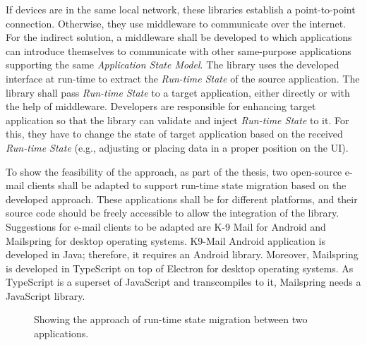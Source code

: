 If devices are in the same local network, these libraries establish a point-to-point connection. Otherwise, they use middleware to communicate over the internet.
For the indirect solution, a middleware shall be developed to which applications can introduce themselves to communicate with other same-purpose applications supporting the same \textit{Application State Model}. 
The library uses the developed interface at run-time to extract the \textit{Run-time State} of the source application. The library shall pass \textit{Run-time State} to a target application, either directly or with the help of middleware. 
Developers are responsible for enhancing target application so that the library can validate and inject \textit{Run-time State} to it. 
For this, they have to change the state of target application based on the received \textit{Run-time State} (e.g., adjusting or placing data in a proper position on the UI). 

To show the feasibility of the approach, as part of the thesis, two open-source e-mail clients shall be adapted to support run-time state migration based on the developed approach. These applications shall be for different platforms, and their source code should be freely accessible to allow the integration of the library.
Suggestions for e-mail clients to be adapted are K-9 Mail for Android and Mailspring for desktop operating systems.
K9-Mail Android application is developed in Java; therefore, it requires an Android library. Moreover, Mailspring is developed in TypeScript on top of Electron for desktop operating systems. As TypeScript is a superset of JavaScript and transcompiles to it\cite{typescript}, Mailspring needs a JavaScript library.

\FloatBarrier
\begin{figure}[!b]
    
    \caption{Showing the approach of run-time state migration between two applications.}
    \label{fig:solution}
\end{figure}
\FloatBarrier

